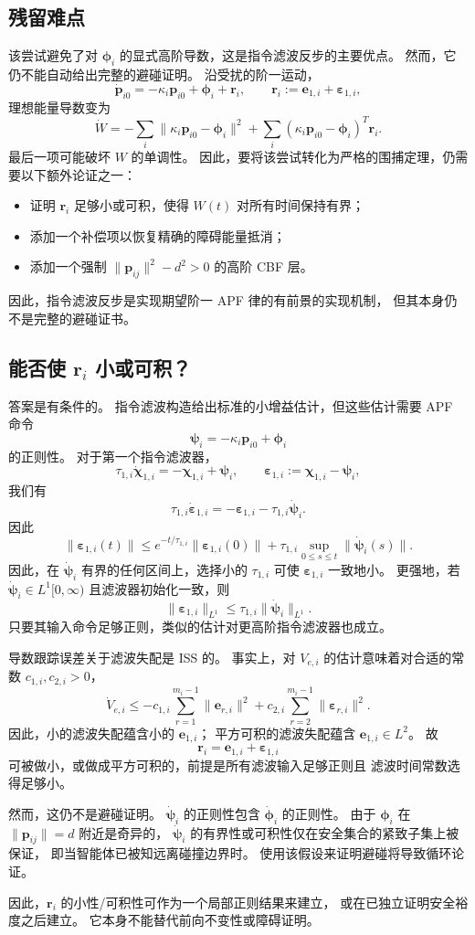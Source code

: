 \subsection{残留难点}

该尝试避免了对 $\bm\phi_i$ 的显式高阶导数，这是指令滤波反步的主要优点。
然而，它仍不能自动给出完整的避碰证明。
沿受扰的阶一运动，
\[
    \dot{\bm p}_{i0}
    =-\kappa_i\bm p_{i0}+\bm\phi_i+\bm r_i,
    \qquad
    \bm r_i:=\bm e_{1,i}+\bm\varepsilon_{1,i},
\]
理想能量导数变为
\[
    \dot W
    =-\sum_i\|\kappa_i\bm p_{i0}-\bm\phi_i\|^2
      +\sum_i(\kappa_i\bm p_{i0}-\bm\phi_i)^T\bm r_i .
\]
最后一项可能破坏 $W$ 的单调性。
因此，要将该尝试转化为严格的围捕定理，仍需要以下额外论证之一：
\begin{itemize}
    \item 证明 $\bm r_i$ 足够小或可积，使得 $W(t)$ 对所有时间保持有界；
    \item 添加一个补偿项以恢复精确的障碍能量抵消；
    \item 添加一个强制 $\|\bm p_{ij}\|^2-d^2>0$ 的高阶 CBF 层。
\end{itemize}

因此，指令滤波反步是实现期望阶一 APF 律的有前景的实现机制，
但其本身仍不是完整的避碰证书。

\subsection{能否使 $\bm r_i$ 小或可积？}

答案是有条件的。
指令滤波构造给出标准的小增益估计，但这些估计需要 APF 命令
\[
    \bm\psi_i=-\kappa_i\bm p_{i0}+\bm\phi_i
\]
的正则性。
对于第一个指令滤波器，
\[
    \tau_{1,i}\dot{\bm\chi}_{1,i}
    =-\bm\chi_{1,i}+\bm\psi_i,\qquad
    \bm\varepsilon_{1,i}:=\bm\chi_{1,i}-\bm\psi_i,
\]
我们有
\[
    \tau_{1,i}\dot{\bm\varepsilon}_{1,i}
    =-\bm\varepsilon_{1,i}-\tau_{1,i}\dot{\bm\psi}_i.
\]
因此
\[
    \|\bm\varepsilon_{1,i}(t)\|
    \le e^{-t/\tau_{1,i}}\|\bm\varepsilon_{1,i}(0)\|
    +\tau_{1,i}\sup_{0\le s\le t}\|\dot{\bm\psi}_i(s)\|.
\]
因此，在 $\dot{\bm\psi}_i$ 有界的任何区间上，选择小的 $\tau_{1,i}$ 可使
$\bm\varepsilon_{1,i}$ 一致地小。
更强地，若 $\dot{\bm\psi}_i\in L^1[0,\infty)$ 且滤波器初始化一致，则
\[
    \|\bm\varepsilon_{1,i}\|_{L^1}
    \le \tau_{1,i}\|\dot{\bm\psi}_i\|_{L^1}.
\]
只要其输入命令足够正则，类似的估计对更高阶指令滤波器也成立。

导数跟踪误差关于滤波失配是 ISS 的。
事实上，对 $V_{e,i}$ 的估计意味着对合适的常数 $c_{1,i},c_{2,i}>0$，
\[
    \dot V_{e,i}
    \le -c_{1,i}\sum_{r=1}^{m_i-1}\|\bm e_{r,i}\|^2
       +c_{2,i}\sum_{r=2}^{m_i-1}\|\bm\varepsilon_{r,i}\|^2 .
\]
因此，小的滤波失配蕴含小的 $\bm e_{1,i}$；
平方可积的滤波失配蕴含 $\bm e_{1,i}\in L^2$。
故
\[
    \bm r_i=\bm e_{1,i}+\bm\varepsilon_{1,i}
\]
可被做小，或做成平方可积的，前提是所有滤波输入足够正则且
滤波时间常数选得足够小。

然而，这仍不是避碰证明。
$\dot{\bm\psi}_i$ 的正则性包含 $\dot{\bm\phi}_i$ 的正则性。
由于 $\bm\phi_i$ 在 $\|\bm p_{ij}\|=d$ 附近是奇异的，
$\dot{\bm\psi}_i$ 的有界性或可积性仅在安全集合的紧致子集上被保证，
即当智能体已被知远离碰撞边界时。
使用该假设来证明避碰将导致循环论证。

因此，$\bm r_i$ 的小性/可积性可作为一个局部正则结果来建立，
或在已独立证明安全裕度之后建立。
它本身不能替代前向不变性或障碍证明。